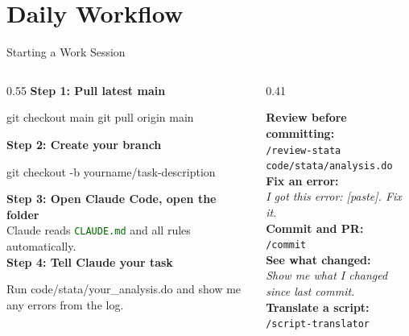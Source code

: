 \documentclass[aspectratio=169,11pt,dvipsnames]{beamer}
\newcommand{\file}[1]{\textcolor{darkgreen}{\nolinkurl{#1}}}
\begin{document}
\section{Daily Workflow}

\begin{frame}[fragile]{Starting a Work Session}
  \begin{columns}[T]
    \begin{column}{0.55\textwidth}
      \textbf{Step 1: Pull latest main}
      \begin{codebox}
git checkout main
git pull origin main
      \end{codebox}
      \textbf{Step 2: Create your branch}
      \begin{codebox}
git checkout -b yourname/task-description
      \end{codebox}
      \textbf{Step 3: Open Claude Code, open the folder}\\
      Claude reads \file{CLAUDE.md} and all rules automatically.\\[0.3cm]
      \textbf{Step 4: Tell Claude your task}
      \begin{codebox}
Run code/stata/your_analysis.do
and show me any errors from the log.
      \end{codebox}
    \end{column}
    \begin{column}{0.41\textwidth}
      \begin{greenbox}[title=Useful daily prompts]
        \small
        \textbf{Review before committing:}\\
        \texttt{/review-stata code/stata/analysis.do}\\[0.3cm]
        \textbf{Fix an error:}\\
        \textit{I got this error: [paste]. Fix it.}\\[0.3cm]
        \textbf{Commit and PR:}\\
        \texttt{/commit}\\[0.3cm]
        \textbf{See what changed:}\\
        \textit{Show me what I changed since last commit.}\\[0.3cm]
        \textbf{Translate a script:}\\
        \texttt{/script-translator}
      \end{greenbox}
    \end{column}
  \end{columns}
\end{frame}
\end{document}
